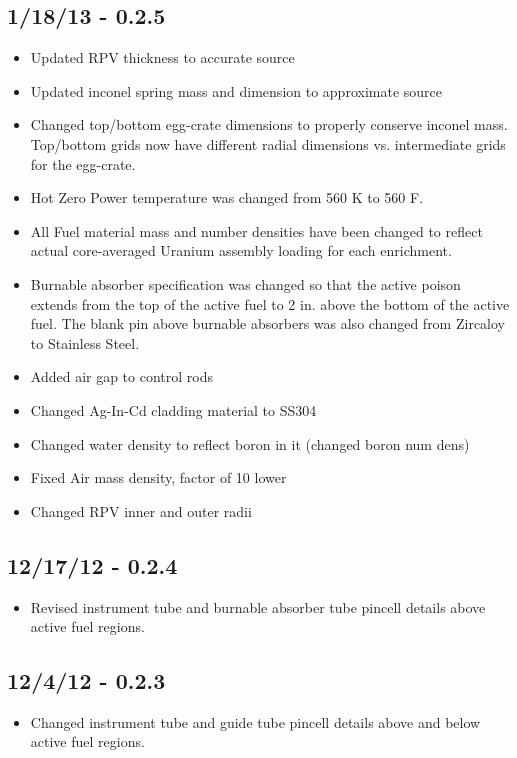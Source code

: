 \subsection*{1/18/13 - 0.2.5}
\begin{itemize}
  \item Updated RPV thickness to accurate source
  \item Updated inconel spring mass and dimension to approximate source
  \item Changed top/bottom egg-crate dimensions to properly conserve inconel
  mass. Top/bottom grids now have different radial dimensions vs. intermediate
  grids for the egg-crate.
  \item Hot Zero Power temperature was changed from 560 K to 560 F.
  \item All Fuel material mass and number densities have been changed to reflect
  actual core-averaged Uranium assembly loading for each enrichment.
  \item Burnable absorber specification was changed so that the active poison
  extends from the top of the active fuel to 2 in. above the bottom of the
  active fuel. The blank pin above burnable absorbers was also changed from
  Zircaloy to Stainless Steel.
  \item Added air gap to control rods
  \item Changed Ag-In-Cd cladding material to SS304
  \item Changed water density to reflect boron in it (changed boron num dens)
  \item Fixed Air mass density, factor of 10 lower
  \item Changed RPV inner and outer radii
\end{itemize}

\subsection*{12/17/12 - 0.2.4}
\begin{itemize}
  \item Revised instrument tube and burnable absorber tube pincell details above
  active fuel regions.
\end{itemize}

\subsection*{12/4/12 - 0.2.3}
\begin{itemize}
  \item Changed instrument tube and guide tube pincell details above and below
  active fuel regions.
\end{itemize}

